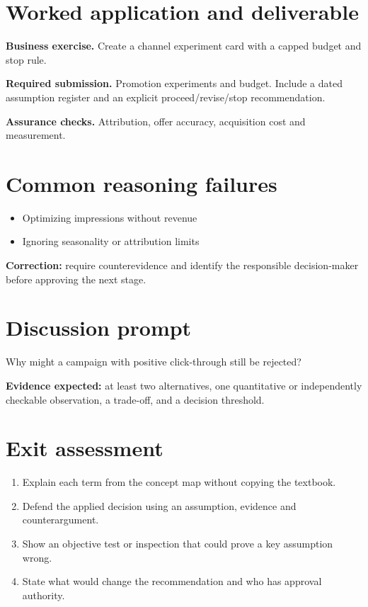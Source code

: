 \documentclass[11pt,letterpaper]{article}
\begin{document}
\section{Worked application and deliverable}
\textbf{Business exercise.} Create a channel experiment card with a capped budget and stop rule.\par\textbf{Required submission.} Promotion experiments and budget. Include a dated assumption register and an explicit proceed/revise/stop recommendation.\par\textbf{Assurance checks.} Attribution, offer accuracy, acquisition cost and measurement.
\section{Common reasoning failures}
\begin{itemize}[leftmargin=*,itemsep=3pt]
\item Optimizing impressions without revenue
\item Ignoring seasonality or attribution limits
\end{itemize}
\noindent\textbf{Correction:} require counterevidence and identify the responsible decision-maker before approving the next stage.
\section{Discussion prompt}
Why might a campaign with positive click-through still be rejected?\par\medskip\textbf{Evidence expected:} at least two alternatives, one quantitative or independently checkable observation, a trade-off, and a decision threshold.
\section{Exit assessment}
\begin{enumerate}[leftmargin=*,itemsep=5pt]
\item Explain each term from the concept map without copying the textbook.
\item Defend the applied decision using an assumption, evidence and counterargument.
\item Show an objective test or inspection that could prove a key assumption wrong.
\item State what would change the recommendation and who has approval authority.
\end{enumerate}

\end{document}
